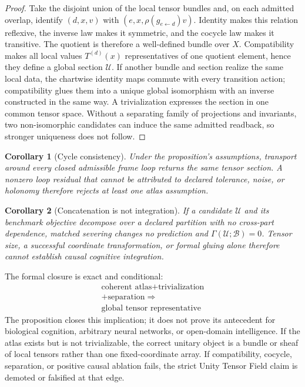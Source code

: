 \documentclass[10pt,twocolumn]{article}
\theoremstyle{definition}
\theoremstyle{plain}
\newtheorem{corollary}{Corollary}[proposition]
\theoremstyle{remark}
\begin{document}
\begin{proof}
Take the disjoint union of the local tensor bundles and, on each admitted overlap, identify $(d,x,v)$ with $(e,x,\rho(g_{e\leftarrow d})v)$.  Identity makes this relation reflexive, the inverse law makes it symmetric, and the cocycle law makes it transitive.  The quotient is therefore a well-defined bundle over $X$.  Compatibility makes all local values $T^{(d)}(x)$ representatives of one quotient element, hence they define a global section $\mathcal U$.  If another bundle and section realize the same local data, the chartwise identity maps commute with every transition action; compatibility glues them into a unique global isomorphism with an inverse constructed in the same way.  A trivialization expresses the section in one common tensor space.  Without a separating family of projections and invariants, two non-isomorphic candidates can induce the same admitted readback, so stronger uniqueness does not follow.
\end{proof}

\begin{corollary}[Cycle consistency]
\label{cor:unity-cycle}
Under the proposition's assumptions, transport around every closed admissible frame loop returns the same tensor section.  A nonzero loop residual that cannot be attributed to declared tolerance, noise, or holonomy therefore rejects at least one atlas assumption.
\end{corollary}

\begin{corollary}[Concatenation is not integration]
\label{cor:unity-concatenation}
If a candidate $\mathcal U$ and its benchmark objective decompose over a declared partition with no cross-part dependence, matched severing changes no prediction and $\Gamma(\mathcal U;\mathcal B)=0$.  Tensor size, a successful coordinate transformation, or formal gluing alone therefore cannot establish causal cognitive integration.
\end{corollary}

The formal closure is exact and conditional:
\begin{equation}
\boxed{\begin{gathered}
\text{coherent atlas}+\text{trivialization}\\
+\text{separation}\Longrightarrow\\
\text{global tensor representative}
\end{gathered}}
\label{eq:unity-conditional-closure}
\end{equation}
The proposition closes this implication; it does not prove its antecedent for biological cognition, arbitrary neural networks, or open-domain intelligence.  If the atlas exists but is not trivializable, the correct unitary object is a bundle or sheaf of local tensors rather than one fixed-coordinate array.  If compatibility, cocycle, separation, or positive causal ablation fails, the strict Unity Tensor Field claim is demoted or falsified at that edge.
\end{document}

